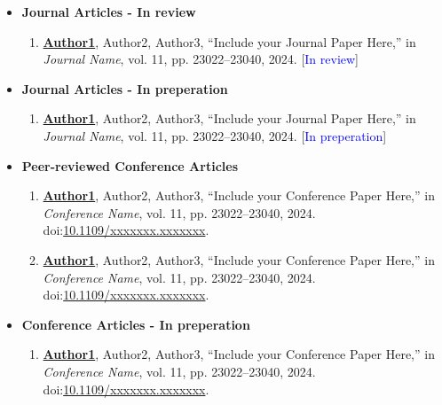 \begin{itemize}
	\item \textbf{Journal Articles - In review}
	\renewcommand{\theenumi}{J\arabic{enumi}}
	\begin{enumerate}
		\small
		\setcounter{enumi}{3}
		\item{\textbf{\underline{Author1}}, Author2, Author3,  “Include your Journal Paper Here,” in \textit{Journal Name}, vol. 11, pp. 23022–23040, 2024. [\textcolor{blue}{In review}]}
	\end{enumerate}  
\end{itemize}

\begin{itemize}
	\item \textbf{Journal Articles - In preperation}
	\renewcommand{\theenumi}{J\arabic{enumi}}
	\begin{enumerate}
		\small
		\setcounter{enumi}{5}
		\item{\textbf{\underline{Author1}}, Author2, Author3,  “Include your Journal Paper Here,” in \textit{Journal Name}, vol. 11, pp. 23022–23040, 2024. [\textcolor{blue}{In preperation}]}
	\end{enumerate}  
\end{itemize}


\begin{itemize}
	\item \textbf{Peer-reviewed Conference Articles}
	\renewcommand{\theenumi}{C\arabic{enumi}}
	\begin{enumerate}
		\small
		\setcounter{enumi}{0}
		\item{\textbf{\underline{Author1}}, Author2, Author3,  “Include your Conference Paper Here,” in \textit{Conference Name}, vol. 11, pp. 23022–23040, 2024. doi:\href{https://ieeexplore.ieee.org/document/9551398}{10.1109/xxxxxxx.xxxxxxx}.}
		\vspace{2mm}
		\item{\textbf{\underline{Author1}}, Author2, Author3,  “Include your Conference Paper Here,” in \textit{Conference Name}, vol. 11, pp. 23022–23040, 2024. doi:\href{https://ieeexplore.ieee.org/document/9551398}{10.1109/xxxxxxx.xxxxxxx}.}
	\end{enumerate}
\end{itemize}

\begin{itemize}
	\item \textbf{Conference Articles - In preperation}
	\renewcommand{\theenumi}{C\arabic{enumi}}
	\begin{enumerate}
		\small
		\setcounter{enumi}{2}
		\item{\textbf{\underline{Author1}}, Author2, Author3,  “Include your Conference Paper Here,” in \textit{Conference Name}, vol. 11, pp. 23022–23040, 2024. doi:\href{https://ieeexplore.ieee.org/document/9551398}{10.1109/xxxxxxx.xxxxxxx}.}
	\end{enumerate}  
\end{itemize}


